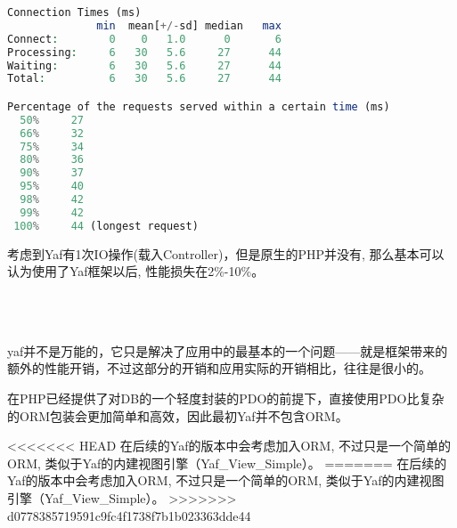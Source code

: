 \begin{compactitem}
\begin{lstlisting}[language=PHP]
Connection Times (ms)
              min  mean[+/-sd] median   max
Connect:        0    0   1.0      0       6
Processing:     6   30   5.6     27      44
Waiting:        6   30   5.6     27      44
Total:          6   30   5.6     27      44

Percentage of the requests served within a certain time (ms)
  50%     27
  66%     32
  75%     34
  80%     36
  90%     37
  95%     40
  98%     42
  99%     42
 100%     44 (longest request)
\end{lstlisting}


\end{compactitem}

考虑到Yaf有1次IO操作(载入Controller)，但是原生的PHP并没有, 那么基本可以认为使用了Yaf框架以后, 性能损失在2\%-10\%。




\begin{lstlisting}[language=PHP]

\end{lstlisting}



\begin{lstlisting}[language=PHP]

\end{lstlisting}



\begin{lstlisting}[language=PHP]

\end{lstlisting}



\begin{lstlisting}[language=PHP]

\end{lstlisting}





yaf并不是万能的，它只是解决了应用中的最基本的一个问题——就是框架带来的额外的性能开销，不过这部分的开销和应用实际的开销相比，往往是很小的。

在PHP已经提供了对DB的一个轻度封装的PDO的前提下，直接使用PDO比复杂的ORM包装会更加简单和高效，因此最初Yaf并不包含ORM。

<<<<<<< HEAD
在后续的Yaf的版本中会考虑加入ORM, 不过只是一个简单的ORM, 类似于Yaf的内建视图引擎（Yaf_View_Simple）。
=======
在后续的Yaf的版本中会考虑加入ORM, 不过只是一个简单的ORM, 类似于Yaf的内建视图引擎（Yaf\_View\_Simple）。
>>>>>>> d0778385719591c9fc4f1738f7b1b023363dde44



